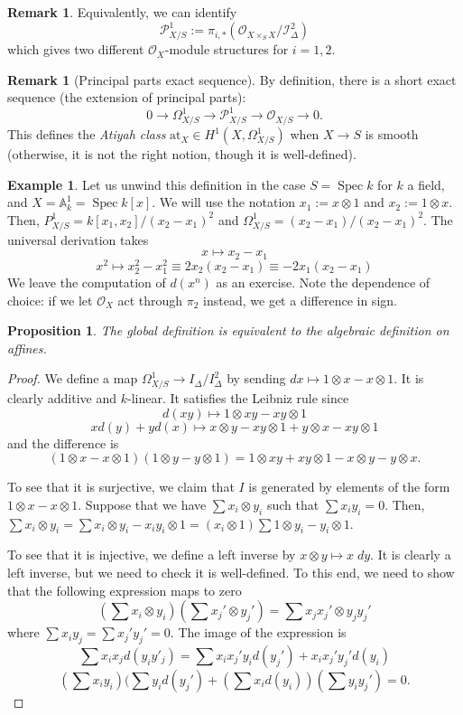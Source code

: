 \documentclass[10pt]{article}
\newtheorem{prop}[thm]{Proposition}
\theoremstyle{definition}
\newtheorem{exmp}[thm]{Example}
\newtheorem{rmk}[thm]{Remark}
\DeclareMathOperator{\Spec}{Spec}
\newcommand{\OO}{\mathcal{O}}
\begin{document}
\begin{rmk}
Equivalently, we can identify
$$\mathcal{P}^1_{X/S} := \pi_{i,*}(\OO_{X \times_S X}/\mathcal{I}^2_{\Delta})$$
which gives two different $\OO_X$-module structures for $i=1,2$.  
\end{rmk}

\begin{rmk}[Principal parts exact sequence]
By definition, there is a short exact sequence (the extension of principal parts):
$$0 \rightarrow \Omega^1_{X/S} \rightarrow \mathcal{P}^1_{X/S} \rightarrow \OO_{X/S} \rightarrow 0.$$
This defines the \emph{Atiyah class} $\mathrm{at}_X \in H^1(X, \Omega^1_{X/S})$ when $X \rightarrow S$ is smooth (otherwise, it is not the right notion, though it is well-defined).
\end{rmk}

\begin{exmp}
Let us unwind this definition in the case $S = \Spec k$ for $k$ a field, and $X = \mathbb{A}^1_k = \Spec k[x]$.  We will use the notation $x_1 := x \otimes 1$ and $x_2 := 1 \otimes x$.  Then, $P^1_{X/S} = k[x_1, x_2]/(x_2 - x_1)^2$ and $\Omega^1_{X/S} = (x_2 - x_1)/(x_2-x_1)^2$.  The universal derivation takes
$$x \mapsto x_2 - x_1$$
$$x^2 \mapsto x_2^2 - x_1^2 \equiv 2x_2(x_2-x_1) \equiv -2x_1(x_2 - x_1)$$
We leave the computation of $d(x^n)$ as an exercise.  Note the dependence of choice: if we let $\OO_X$ act through $\pi_2$ instead, we get a difference in sign.
\end{exmp}

\begin{prop}
The global definition is equivalent to the algebraic definition on affines.
\end{prop}
\begin{proof}
We define a map $\Omega^1_{X/S} \rightarrow I_\Delta/I^2_\Delta$ by sending $dx \mapsto 1 \otimes x - x \otimes 1$.  It is clearly additive and $k$-linear.  It satisfies the Leibniz rule since
$$d(xy) \mapsto 1 \otimes xy - xy \otimes 1$$
$$x d(y) + y d(x) \mapsto x \otimes y - xy \otimes 1 + y \otimes x - xy \otimes 1$$
and the difference is
$$(1 \otimes x - x \otimes 1)(1 \otimes y - y \otimes 1) = 1 \otimes xy + xy \otimes 1 - x \otimes y - y \otimes x.$$

To see that it is surjective, we claim that $I$ is generated by elements of the form $1 \otimes x - x \otimes 1$.  Suppose that we have $\sum x_i \otimes y_i$ such that $\sum x_i y_i = 0$.  Then, $\sum x_i \otimes y_i = \sum x_i \otimes y_i - x_i y_i \otimes 1 = (x_i \otimes 1) \sum 1 \otimes y_i - y_i \otimes 1$.

To see that it is injective, we define a left inverse by $x \otimes y \mapsto x \; dy$.  It is clearly a left inverse, but we need to check it is well-defined.  To this end, we need to show that the following expression maps to zero
$$(\sum x_i \otimes y_i)(\sum x_j' \otimes y_j') = \sum x_j x_j' \otimes y_j y_j'$$
where $\sum x_i y_j = \sum x_j' y_j' = 0$.  The image of the expression is
$$\sum x_i x_j d(y_i y'_j) = \sum x_i x_j' y_i d(y_j') + x_i x_j' y_j' d(y_i)$$
$$(\sum x_i y_i)(\sum y_i d(y_j') + (\sum x_i d(y_i))(\sum y_i y_j') = 0.$$
\end{proof}
\end{document}
